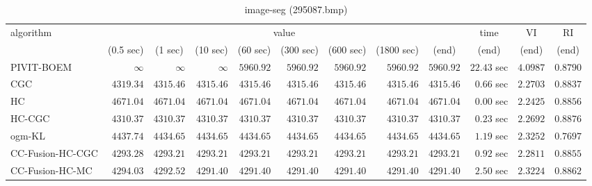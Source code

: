 \begin{table}[H]
\scriptsize
\centering
\caption{image-seg (295087.bmp)}
\label{tab:anytimetable-image-seg-295087.bmp}
\begin{tabular}{lrrrrrrrrrrr}
\toprule
           algorithm &                                   \multicolumn{8}{c}{value} & \multicolumn{1}{c}{time}    & \multicolumn{1}{c}{VI}  & \multicolumn{1}{c}{RI} \\  
\cmidrule(lr){2-9}\cmidrule(lr){10-10} \cmidrule(lr){11-11} \cmidrule(lr){12-12}   
                     & \multicolumn{1}{c}{(0.5 sec)} & \multicolumn{1}{c}{(1 sec)} & \multicolumn{1}{c}{(10 sec)} & \multicolumn{1}{c}{(60 sec)} & \multicolumn{1}{c}{(300 sec)} & \multicolumn{1}{c}{(600 sec)} & \multicolumn{1}{c}{(1800 sec)} & \multicolumn{1}{c}{(end)} & \multicolumn{1}{c}{(end)}    & \multicolumn{1}{c}{(end)}   & \multicolumn{1}{c}{(end)}  \\ \midrule 
          PIVIT-BOEM & $\infty$ & $\infty$ & $\infty$ & $      5960.92$ & $      5960.92$ & $      5960.92$ & $      5960.92$ & $      5960.92$ & $        22.43$ sec    & $       4.0987$  & $       0.8790$ \\ 
                 CGC & $      4319.34$ & $      4315.46$ & $      4315.46$ & $      4315.46$ & $      4315.46$ & $      4315.46$ & $      4315.46$ & $      4315.46$ & $         0.66$ sec    & $       2.2703$  & $       0.8837$ \\ 
                  HC & $      4671.04$ & $      4671.04$ & $      4671.04$ & $      4671.04$ & $      4671.04$ & $      4671.04$ & $      4671.04$ & $      4671.04$ & $         0.00$ sec    & $       2.2425$  & $       0.8856$ \\ 
              HC-CGC & $      4310.37$ & $      4310.37$ & $      4310.37$ & $      4310.37$ & $      4310.37$ & $      4310.37$ & $      4310.37$ & $      4310.37$ & $         0.23$ sec    & $       2.2692$  & $       0.8876$ \\ 
              ogm-KL & $      4437.74$ & $      4434.65$ & $      4434.65$ & $      4434.65$ & $      4434.65$ & $      4434.65$ & $      4434.65$ & $      4434.65$ & $         1.19$ sec    & $       2.3252$  & $       0.7697$ \\ 
    CC-Fusion-HC-CGC & $      4293.28$ & $      4293.21$ & $      4293.21$ & $      4293.21$ & $      4293.21$ & $      4293.21$ & $      4293.21$ & $      4293.21$ & $         0.92$ sec    & $       2.2811$  & $       0.8855$ \\ 
     CC-Fusion-HC-MC & $      4294.03$ & $      4292.52$ & $      4291.40$ & $      4291.40$ & $      4291.40$ & $      4291.40$ & $      4291.40$ & $      4291.40$ & $         2.50$ sec    & $       2.3224$  & $       0.8862$ \\ 

\end{tabular}
\end{table}

